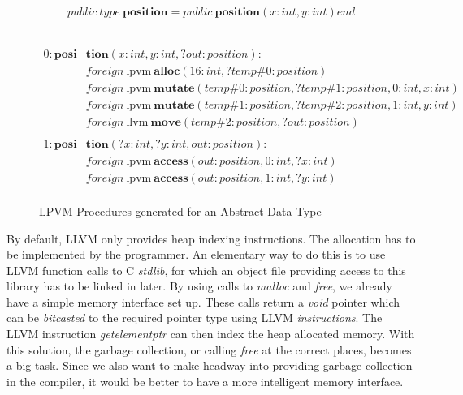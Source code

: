 \begin{figure}
  \begin{minipage}{\textwidth}
    \begin{equation*}
      public\ type\ \mathbf{position} = public\ \mathbf{position}(x:int, y:int) end
    \end{equation*}\\
  \end{minipage}
  \begin{minipage}{\textwidth}
    \begin{align*}
      0: \mathbf{posi}&\mathbf{tion}(x:int, y:int, ?out:position): \\
          & foreign\ \mathrm{lpvm}\ \mathbf{alloc}(16:int, ?temp\#0:position) \\
          & foreign\ \mathrm{lpvm}\ \mathbf{mutate}(temp\#0:position, ?temp\#1:position,
            0:int, x:int) \\
          & foreign\ \mathrm{lpvm}\ \mathbf{mutate}(temp\#1:position, ?temp\#2:position,
            1:int, y:int) \\
          & foreign\ \mathrm{llvm}\ \mathbf{move}(temp\#2:position,
            ?out:position) \\ \\
      1: \mathbf{posi}&\mathbf{tion}(?x:int, ?y:int, out:position): \\
                      & foreign\ \mathrm{lpvm}\ \mathbf{access}(out:position,
                        0:int, ?x:int) \\
                      & foreign\ \mathrm{lpvm}\ \mathbf{access}(out:position,
                        1:int, ?y:int) \\
    \end{align*}
  \end{minipage}
  
  \label{fig:procs_adt}
  \caption{LPVM Procedures generated for an Abstract Data Type}  
\end{figure}

By default, LLVM only provides heap indexing instructions. The allocation has
to be implemented by the programmer. An elementary way to do this is to use
LLVM function calls to C \textit{stdlib}, for which an object file providing
access to this library has to be linked in later. By using calls to
\textit{malloc} and \textit{free}, we already have a simple memory interface
set up. These calls return a \textit{void} pointer which can be
\textit{bitcasted} to the required pointer type using LLVM
\textit{instructions}. The LLVM instruction \textit{getelementptr} can then
index the heap allocated memory. With this solution, the garbage collection, or
calling \textit{free} at the correct places, becomes a big task. Since we also
want to make headway into providing garbage collection in the compiler, it
would be better to have a more intelligent memory interface.

